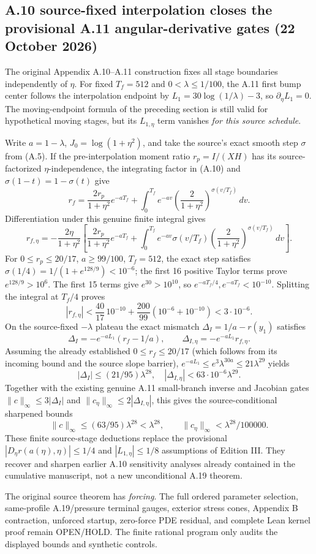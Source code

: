 \subsection*{A.10 source-fixed interpolation closes the provisional A.11 angular-derivative gates (22 October 2026)}
\label{subsec:a11-A10-fixed-stage-closure}
The original Appendix A.10--A.11 construction fixes all stage boundaries
independently of \(\eta\). For fixed \(T_f=512\) and
\(0<\lambda\le1/100\), the A.11 first bump center follows
the interpolation endpoint by
\(L_1=30\log(1/\lambda)-3\), so \(\partial_\eta L_1=0\).
The moving-endpoint formula of the preceding section is still valid
for hypothetical moving stages, but its \(L_{1,\eta}\) term vanishes
\emph{for this source schedule}.

Write \(a=1-\lambda\), \(J_0=\log(1+\eta^2)\), and
take the source's exact smooth step \(\sigma\) from (A.5).
If the pre-interpolation moment ratio \(r_p=I/(XH)\) has its
source-factorized \(\eta\)-independence, the integrating factor in (A.10)
and \(\sigma(1-t)=1-\sigma(t)\) give
\[
r_f=\frac{2r_p}{1+\eta^2}e^{-aT_f}+
 \int_0^{T_f} e^{-av}
 \left(\frac2{1+\eta^2}\right)^{\sigma(v/T_f)}\,dv.
\]
Differentiation under this genuine finite integral gives
\[
\boxed{
r_{f,\eta}=-\frac{2\eta}{1+\eta^2}
\left[\frac{2r_p}{1+\eta^2}e^{-aT_f}+
\int_0^{T_f}e^{-av}\sigma(v/T_f)
\left(\frac2{1+\eta^2}\right)^{\sigma(v/T_f)}\,dv\right].
}
\]
For \(0\le r_p\le20/17\), \(a\ge99/100\), \(T_f=512\),
the exact step satisfies
\(\sigma(1/4)=1/(1+e^{128/9})<10^{-6}\);
the first 16 positive Taylor terms prove \(e^{128/9}>10^6\).
The first 15 terms give \(e^{30}>10^{10}\), so
\(e^{-aT_f/4},e^{-aT_f}<10^{-10}\).
Splitting the integral at \(T_f/4\) proves
\[
\boxed{|r_{f,\eta}|<
\frac{40}{17}\,10^{-10}
+\frac{200}{99}(10^{-6}+10^{-10})<3\cdot10^{-6}.}
\]
On the source-fixed \(-\lambda\) plateau the exact mismatch
\(\Delta_I=1/a-r(y_1)\) satisfies
\[
\Delta_I=-e^{-aL_1}(r_f-1/a),\qquad
\Delta_{I,\eta}=-e^{-aL_1}r_{f,\eta}.
\]
Assuming the already established \(0\le r_f\le20/17\)
(which follows from its incoming bound and the source slope barrier),
\(e^{-aL_1}\le e^3\lambda^{30a}\le21\lambda^{29}\) yields
\[
|\Delta_I|\le(21/95)\lambda^{28},\quad
|\Delta_{I,\eta}|<63\cdot10^{-6}\lambda^{29}.
\]
Together with the existing genuine A.11 small-branch inverse and
Jacobian gates \(\|c\|_\infty\le3|\Delta_I|\) and
\(\|c_\eta\|_\infty\le2|\Delta_{I,\eta}|\), this gives the
source-conditional sharpened bounds
\[
\boxed{\|c\|_\infty\le(63/95)\lambda^{28}<\lambda^{28},
\qquad\|c_\eta\|_\infty<\lambda^{28}/100000.}
\]
These finite source-stage deductions replace the provisional
\(|D_\eta r(a(\eta),\eta)|\le1/4\) and
\(|L_{1,\eta}|\le1/8\) assumptions of Edition III.
They recover and sharpen earlier A.10 sensitivity analyses
already contained in the cumulative manuscript, not a new
unconditional A.19 theorem.

The original source theorem has \emph{forcing}. The full ordered
parameter selection, same-profile A.19/pressure terminal gauges,
exterior stress cones, Appendix B contraction, unforced startup,
zero-force PDE residual, and complete Lean kernel proof remain
OPEN/HOLD. The finite rational program only audits the displayed
bounds and synthetic controls.

